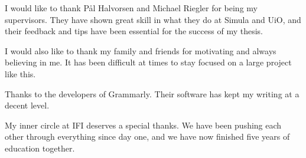 I would like to thank Pål Halvorsen and Michael Riegler for being my supervisors. They have shown great skill in what they do at Simula and UiO, and their feedback and tips have been essential for the success of my thesis.

I would also like to thank my family and friends for motivating and always believing in me. It has been difficult at times to stay focused on a large project like this.

Thanks to the developers of Grammarly. Their software has kept my writing at a decent level.

My inner circle at IFI deserves a special thanks. We have been pushing each other through everything since day one, and we have now finished five years of education together.